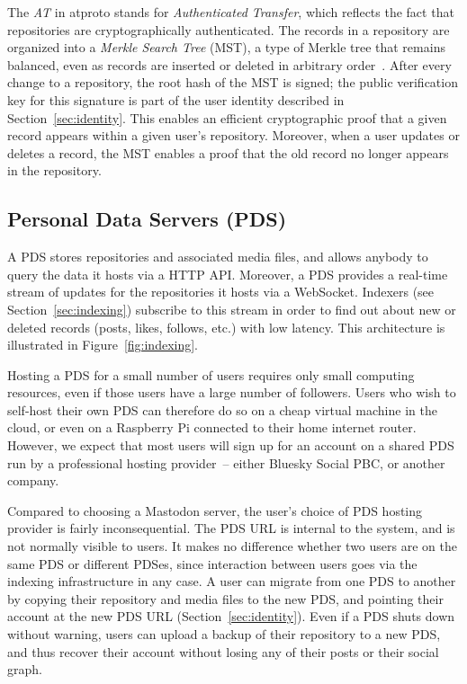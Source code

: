 \documentclass[sigconf]{acmart}
\begin{document}
The \emph{AT} in atproto stands for \emph{Authenticated Transfer}, which reflects the fact that repositories are cryptographically authenticated.
The records in a repository are organized into a \emph{Merkle Search Tree} (MST), a type of Merkle tree that remains balanced, even as records are inserted or deleted in arbitrary order~\cite{Auvolat:2019}.
After every change to a repository, the root hash of the MST is signed; the public verification key for this signature is part of the user identity described in Section~\ref{sec:identity}.
This enables an efficient cryptographic proof that a given record appears within a given user's repository.
Moreover, when a user updates or deletes a record, the MST enables a proof that the old record no longer appears in the repository.

\subsection{Personal Data Servers (PDS)}\label{sec:pds}

A PDS stores repositories and associated media files, and allows anybody to query the data it hosts via a HTTP API.
Moreover, a PDS provides a real-time stream of updates for the repositories it hosts via a WebSocket.
Indexers (see Section~\ref{sec:indexing}) subscribe to this stream in order to find out about new or deleted records (posts, likes, follows, etc.) with low latency.
This architecture is illustrated in Figure~\ref{fig:indexing}.

Hosting a PDS for a small number of users requires only small computing resources, even if those users have a large number of followers.
Users who wish to self-host their own PDS can therefore do so on a cheap virtual machine in the cloud, or even on a Raspberry Pi connected to their home internet router.
However, we expect that most users will sign up for an account on a shared PDS run by a professional hosting provider~-- either Bluesky Social PBC, or another company.

Compared to choosing a Mastodon server, the user's choice of PDS hosting provider is fairly inconsequential.
The PDS URL is internal to the system, and is not normally visible to users.
It makes no difference whether two users are on the same PDS or different PDSes, since interaction between users goes via the indexing infrastructure in any case.
A user can migrate from one PDS to another by copying their repository and media files to the new PDS, and pointing their account at the new PDS URL (Section~\ref{sec:identity}).
Even if a PDS shuts down without warning, users can upload a backup of their repository to a new PDS, and thus recover their account without losing any of their posts or their social graph.
\end{document}
